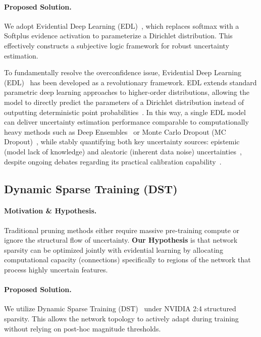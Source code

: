 \documentclass[letterpaper]{article} %
\begin{document}
\paragraph{Proposed Solution.} We adopt Evidential Deep Learning (EDL)~\cite{sensoy2018evidential}, which replaces softmax with a Softplus evidence activation to parameterize a Dirichlet distribution. This effectively constructs a subjective logic framework for robust uncertainty estimation.

To fundamentally resolve the overconfidence issue, Evidential Deep Learning (EDL)~\cite{sensoy2018evidential, bao2021evidential} has been developed as a revolutionary framework. EDL extends standard parametric deep learning approaches to higher-order distributions, allowing the model to directly predict the parameters of a Dirichlet distribution instead of outputting deterministic point probabilities~\cite{sensoy2018evidential, malinin2018predictive}. In this way, a single EDL model can deliver uncertainty estimation performance comparable to computationally heavy methods such as Deep Ensembles~\cite{lakshminarayanan2017simple} or Monte Carlo Dropout (MC Dropout)~\cite{gal2016dropout}, while stably quantifying both key uncertainty sources: epistemic (model lack of knowledge) and aleatoric (inherent data noise) uncertainties~\cite{jospin2022bayesian}, despite ongoing debates regarding its practical calibration capability~\cite{shen2024mirage}.

\subsection{Dynamic Sparse Training (DST)}

\paragraph{Motivation \& Hypothesis.} Traditional pruning methods either require massive pre-training compute or ignore the structural flow of uncertainty. \textbf{Our Hypothesis} is that network sparsity can be optimized jointly with evidential learning by allocating computational capacity (connections) specifically to regions of the network that process highly uncertain features.
\paragraph{Proposed Solution.} We utilize Dynamic Sparse Training (DST)~\cite{evci2020rigging, mocanu2018scalable} under NVIDIA 2:4 structured sparsity. This allows the network topology to actively adapt during training without relying on post-hoc magnitude thresholds.
\end{document}
